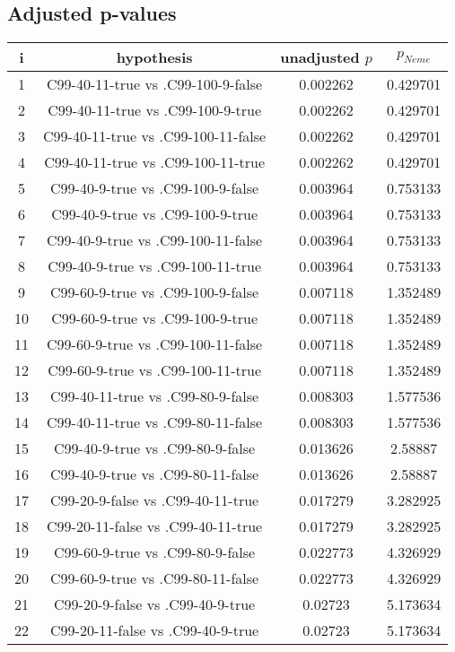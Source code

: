 \documentclass[a4paper,10pt]{article}
\begin{document}
\begin{landscape}
\pagebreak

\subsection{Adjusted p-values}

\begin{table}[!htp]
\centering\scriptsize
\begin{tabular}{cccc}
i&hypothesis&unadjusted $p$&$p_{Neme}$\\
\hline1&C99-40-11-true vs .C99-100-9-false&0.002262&0.429701\\
2&C99-40-11-true vs .C99-100-9-true&0.002262&0.429701\\
3&C99-40-11-true vs .C99-100-11-false&0.002262&0.429701\\
4&C99-40-11-true vs .C99-100-11-true&0.002262&0.429701\\
5&C99-40-9-true vs .C99-100-9-false&0.003964&0.753133\\
6&C99-40-9-true vs .C99-100-9-true&0.003964&0.753133\\
7&C99-40-9-true vs .C99-100-11-false&0.003964&0.753133\\
8&C99-40-9-true vs .C99-100-11-true&0.003964&0.753133\\
9&C99-60-9-true vs .C99-100-9-false&0.007118&1.352489\\
10&C99-60-9-true vs .C99-100-9-true&0.007118&1.352489\\
11&C99-60-9-true vs .C99-100-11-false&0.007118&1.352489\\
12&C99-60-9-true vs .C99-100-11-true&0.007118&1.352489\\
13&C99-40-11-true vs .C99-80-9-false&0.008303&1.577536\\
14&C99-40-11-true vs .C99-80-11-false&0.008303&1.577536\\
15&C99-40-9-true vs .C99-80-9-false&0.013626&2.58887\\
16&C99-40-9-true vs .C99-80-11-false&0.013626&2.58887\\
17&C99-20-9-false vs .C99-40-11-true&0.017279&3.282925\\
18&C99-20-11-false vs .C99-40-11-true&0.017279&3.282925\\
19&C99-60-9-true vs .C99-80-9-false&0.022773&4.326929\\
20&C99-60-9-true vs .C99-80-11-false&0.022773&4.326929\\
21&C99-20-9-false vs .C99-40-9-true&0.02723&5.173634\\
22&C99-20-11-false vs .C99-40-9-true&0.02723&5.173634\\

\end{tabular}
\end{table}
\end{landscape}
\end{document}
